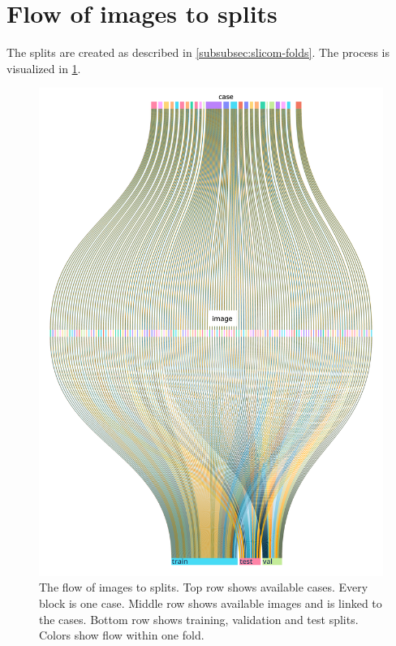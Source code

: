 \section{Flow of images to splits}\label{app:folds-splits-viz}
The splits are created as described in \cref{subsubsec:slicom-folds}.
The process is visualized in \cref{fig:folds-splits-viz}.

\begin{figure}
    \centering
    \includegraphics[height=0.55\paperheight]{pediatric-brain-tumours/images/folds-splits-viz.pdf}
    \caption[Flow of images to splits]{
        The flow of images to splits.
        Top row shows available cases.
        Every block is one case.
        Middle row shows available images and is linked to the cases.
        Bottom row shows training, validation and test splits.
        Colors show flow within one fold.
    }
    \label{fig:folds-splits-viz}
\end{figure}

\